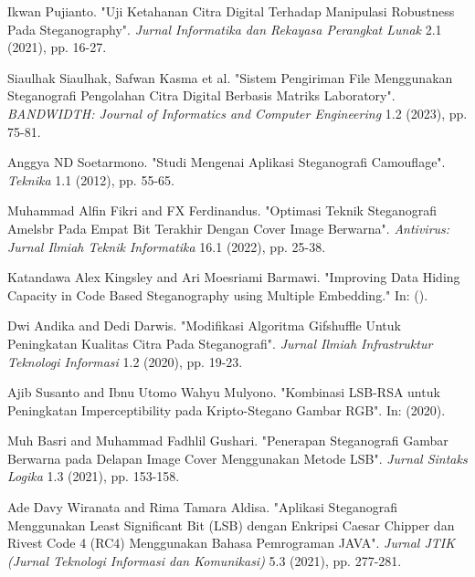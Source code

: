 \documentclass{ittelkom}
\begin{document}
\newpage %
\begin{thebibliography}{99} %

    Ikwan Pujianto. "Uji Ketahanan Citra Digital Terhadap Manipulasi Robustness Pada Steganography". \textit{Jurnal Informatika dan Rekayasa Perangkat Lunak} 2.1 (2021), pp. 16-27.

    Siaulhak Siaulhak, Safwan Kasma et al. "Sistem Pengiriman File Menggunakan Steganografi Pengolahan Citra Digital Berbasis Matriks Laboratory". \textit{BANDWIDTH: Journal of Informatics and Computer Engineering} 1.2 (2023), pp. 75-81.

    Anggya ND Soetarmono. "Studi Mengenai Aplikasi Steganografi Camouflage". \textit{Teknika} 1.1 (2012), pp. 55-65.

    Muhammad Alfin Fikri and FX Ferdinandus. "Optimasi Teknik Steganografi Amelsbr Pada Empat Bit Terakhir Dengan Cover Image Berwarna". \textit{Antivirus: Jurnal Ilmiah Teknik Informatika} 16.1 (2022), pp. 25-38.

    Katandawa Alex Kingsley and Ari Moesriami Barmawi. "Improving Data Hiding Capacity in Code Based Steganography using Multiple Embedding." In: (). %

    Dwi Andika and Dedi Darwis. "Modifikasi Algoritma Gifshuffle Untuk Peningkatan Kualitas Citra Pada Steganografi". \textit{Jurnal Ilmiah Infrastruktur Teknologi Informasi} 1.2 (2020), pp. 19-23.

    Ajib Susanto and Ibnu Utomo Wahyu Mulyono. "Kombinasi LSB-RSA untuk Peningkatan Imperceptibility pada Kripto-Stegano Gambar RGB". In: (2020). %

    Muh Basri and Muhammad Fadhlil Gushari. "Penerapan Steganografi Gambar Berwarna pada Delapan Image Cover Menggunakan Metode LSB". \textit{Jurnal Sintaks Logika} 1.3 (2021), pp. 153-158.

    Ade Davy Wiranata and Rima Tamara Aldisa. "Aplikasi Steganografi Menggunakan Least Significant Bit (LSB) dengan Enkripsi Caesar Chipper dan Rivest Code 4 (RC4) Menggunakan Bahasa Pemrograman JAVA". \textit{Jurnal JTIK (Jurnal Teknologi Informasi dan Komunikasi)} 5.3 (2021), pp. 277-281.


\end{thebibliography}
\end{document}
